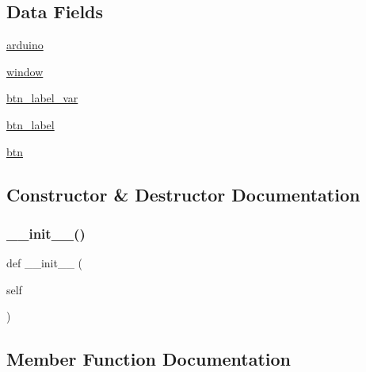 \subsection*{Data Fields}
\begin{DoxyCompactItemize}
\item 
\mbox{\hyperlink{class_g_u_i_01_briefkasten_1_1_briefkasten_window_a3f424772edaa120b12bda2b9addc2bf5}{arduino}}
\item 
\mbox{\hyperlink{class_g_u_i_01_briefkasten_1_1_briefkasten_window_a04a8a2bbfa9c15500892b8e5033d625b}{window}}
\item 
\mbox{\hyperlink{class_g_u_i_01_briefkasten_1_1_briefkasten_window_a5db4d4152e9523bec44f0d385fb11e4c}{btn\+\_\+label\+\_\+var}}
\item 
\mbox{\hyperlink{class_g_u_i_01_briefkasten_1_1_briefkasten_window_a70069e35886a69852e6a41b1fb7a54be}{btn\+\_\+label}}
\item 
\mbox{\hyperlink{class_g_u_i_01_briefkasten_1_1_briefkasten_window_ab1f00069d86d1b1307d0b5e13a9765ae}{btn}}
\end{DoxyCompactItemize}


\subsection{Constructor \& Destructor Documentation}
\mbox{\label{class_g_u_i_01_briefkasten_1_1_briefkasten_window_ae64f0875afe3067b97ba370b354b9213}} 
\subsubsection{\texorpdfstring{\+\_\+\+\_\+init\+\_\+\+\_\+()}{\_\_init\_\_()}}
{\footnotesize\ttfamily def \+\_\+\+\_\+init\+\_\+\+\_\+ (\begin{DoxyParamCaption}\item[{}]{self }\end{DoxyParamCaption})}



\subsection{Member Function Documentation}
\mbox{\label{class_g_u_i_01_briefkasten_1_1_briefkasten_window_a7e20a417210b832ce9e307ce5dc0f2a8}} 
